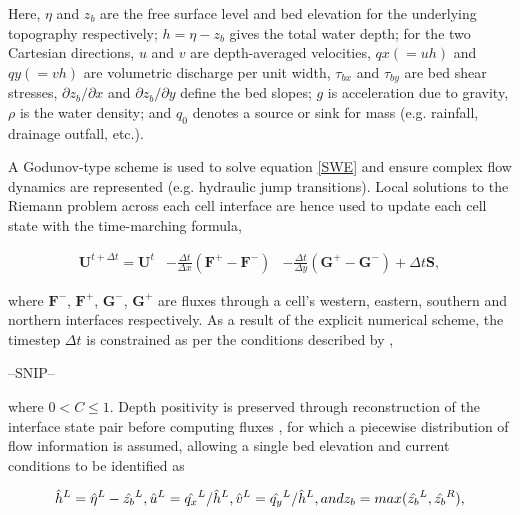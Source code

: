 Here, \(\eta\) and \(z_{b}\) are the free surface level and bed elevation for the underlying topography respectively; \(h = \eta - z_{b}\) gives the total water depth; for the two Cartesian directions, \(u\) and \(v\) are depth-averaged velocities, \(qx (=uh)\) and \(qy (=vh)\) are volumetric discharge per unit width, \(\tau_{bx}\) and \(\tau_{by}\) are bed shear stresses, \(\partial{z_{b}} / \partial{x}\) and \(\partial{z_{b}} / \partial{y}\) define the bed slopes; \(g\) is acceleration due to gravity, \(\rho\) is the water density; and \(q_{0}\) denotes a source or sink for mass (e.g. rainfall, drainage outfall, etc.).

A Godunov-type scheme is used to solve equation \eqref{SWE} and ensure complex flow dynamics are represented (e.g. hydraulic jump transitions). Local solutions to the Riemann problem across each cell interface are hence used to update each cell state with the time-marching formula,

\begin{equation}
	\label{GodunovUpdate}
	\begin{alignedat}{2}
	\textbf{U}^{t+\Delta t} = \textbf{U}^t & - \frac{\Delta t}{\Delta x}(\textbf{F}^+ - \textbf{F}^-) 
					     &  - \frac{\Delta t}{\Delta y}(\textbf{G}^+ - \textbf{G}^-) + \Delta t \textbf{S} , 
	\end{alignedat}
\end{equation}

where \(\textbf{F}^-\), \(\textbf{F}^+\), \(\textbf{G}^-\), \(\textbf{G}^+\) are fluxes through a cell's western, eastern, southern and northern interfaces respectively. As a result of the explicit numerical scheme, the timestep \(\Delta{t}\) is constrained as per the conditions described by \citet{Courant1967},

--SNIP--

where \(0 < C \le 1\). Depth positivity is preserved through reconstruction of the interface state pair before computing fluxes \citep{Liang2010a}, for which a piecewise distribution of flow information is assumed, allowing a single bed elevation and current conditions to be identified as

\begin{equation}
	\label{Reconstruction1}
		\hat{h}^L = \hat{\eta}^{L} - \hat{z_{b}}^{L}, \hfill
		\hat{u}^L = \hat{q_x}^{L} / \hat{h}^{L}, \hfill
		\hat{v}^L = \hat{q_y}^{L} / \hat{h}^{L}, \hfill and \hfill
		z_b = max( \hat{z_b}^{L} , \hat{z_{b}}^{R} ) , \hfill
\end{equation}

